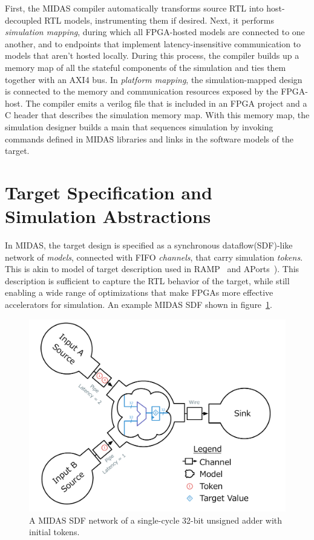 First, the MIDAS compiler automatically transforms source RTL into
host-decoupled RTL models, instrumenting them if desired. Next, it performs
\emph{simulation mapping}, during which all FPGA-hosted models are connected to
one another, and to endpoints that implement latency-insensitive communication
to models that aren't hosted locally. During this process, the compiler builds
up a memory map of all the stateful components of the simulation and ties them
together with an AXI4 bus. In \emph{platform mapping}, the simulation-mapped
design is connected to the memory and communication resources exposed by the
FPGA-host. The compiler emits a verilog file that is included in an FPGA
project and a C header that describes the simulation memory map.  With this
memory map, the simulation designer builds a main that sequences simulation by
invoking commands defined in MIDAS libraries and links in the software models
of the target.

\section{Target Specification and Simulation Abstractions}\label{sec:sdf}

In MIDAS, the target design is specified as a synchronous dataflow(SDF)-like
network of \emph{models}, connected with FIFO \emph{channels}, that carry
simulation \emph{tokens}. This is akin to model of target description used in
RAMP~\cite{ramp} and APorts~\cite{APortNetworks}). This description is sufficient
to capture the RTL behavior of the target, while still enabling a wide range of
optimizations that make FPGAs more effective accelerators for simulation. An
example MIDAS SDF shown in figure~\ref{fig:adder-example}.

\begin{figure}
	\centering
	\includegraphics[width=16cm]{figures/adder-example.pdf}
    \caption{A MIDAS SDF network of a single-cycle 32-bit unsigned adder with initial tokens.}
	\label{fig:adder-example}
\end{figure}

